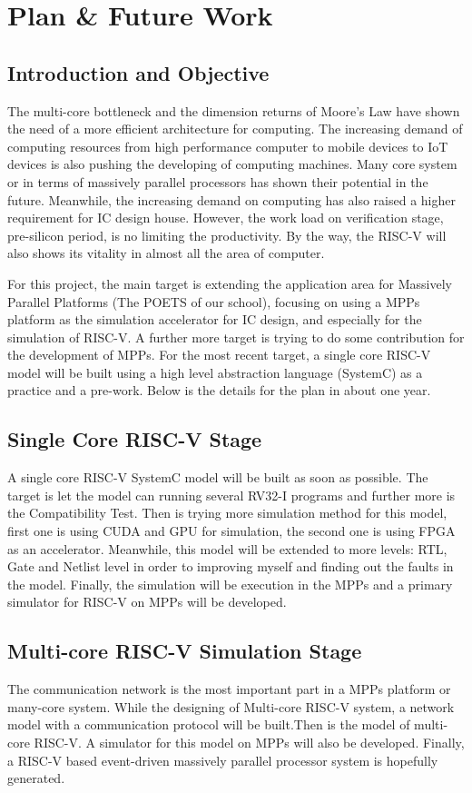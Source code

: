 \chapter{Plan \& Future Work}
\section{Introduction and Objective}

\par
The multi-core bottleneck and the dimension returns of Moore's Law have shown the need of a more efficient architecture for computing. The increasing demand of computing resources from high performance computer to mobile devices to IoT devices is also pushing the developing of computing machines. Many core system or in terms of massively parallel processors has shown their potential in the future.
Meanwhile, the increasing demand on computing has also raised a higher requirement for IC design house. However, the work load on verification stage, pre-silicon period, is no limiting the productivity.
By the way, the RISC-V will also shows its vitality in almost all the area of computer. 
\par 
For this project, the main target is extending the application area for Massively Parallel Platforms (The POETS of our school), focusing on using a MPPs platform as the simulation accelerator for IC design, and especially for the simulation of RISC-V. A further more target is trying to do some contribution for the development of MPPs.
For the most recent target, a single core RISC-V model will be built using a high level abstraction language (SystemC)  as a practice and a pre-work. Below is the details for the plan in about one year.


\section{Single Core RISC-V Stage}
A single core RISC-V SystemC model will be built as soon as possible. The target is let the model can running several RV32-I programs and further more is the Compatibility Test.
Then is trying more simulation method for this model, first one is using CUDA and GPU for simulation, the second one is using FPGA as an accelerator. 
Meanwhile, this model will be extended to more levels: RTL, Gate and Netlist level in order to improving myself and finding out the faults in the model.
Finally, the simulation will be execution in the MPPs and a primary simulator for RISC-V on MPPs will be developed.
\section{Multi-core RISC-V Simulation Stage}
The communication network is the most important part in a MPPs platform or many-core system. While the designing of Multi-core RISC-V system, a network model with a communication protocol will be built.Then is the model of multi-core RISC-V. A simulator for this model on MPPs will also be developed. Finally, a RISC-V based event-driven massively parallel processor system is hopefully generated.  

